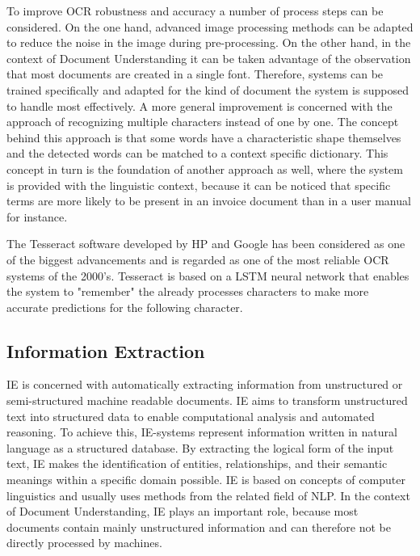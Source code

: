 To improve \ac{OCR} robustness and accuracy a number of process steps can be considered. On the one hand, advanced image processing methods can be adapted to reduce the noise in the image during pre-processing. On the other hand, in the context of Document Understanding it can be taken advantage of the observation that most documents are created in a single font. Therefore, systems can be trained specifically and adapted for the kind of document the system is supposed to handle most effectively.
A more general improvement is concerned with the approach of recognizing multiple characters instead of one by one. The concept behind this approach is that some words have a characteristic shape themselves and the detected words can be matched to a context specific dictionary. This concept in turn is the foundation of another approach as well, where the system is provided with the linguistic context, because it can be noticed that specific terms are more likely to be present in an invoice document than in a user manual for instance. \cite{nagy1999optical,baird2004robust}

The Tesseract software developed by HP and Google has been considered as one of the biggest advancements and is regarded as one of the most reliable \ac{OCR} systems of the 2000's. Tesseract is based on a \ac{LSTM} neural network that enables the system to "remember" the already processes characters to make more accurate predictions for the following character. \cite{Tesseract,hochreiter1997long}

\subsection{Information Extraction}
\ac{IE} is concerned with automatically extracting information from unstructured or semi-structured machine readable documents. \ac{IE} aims to transform unstructured text into structured data to enable computational analysis and automated reasoning. To achieve this, \ac{IE}-systems represent information written in natural language as a structured database. By extracting the logical form of the input text, \ac{IE} makes the identification of entities, relationships, and their semantic meanings within a specific domain possible. \ac{IE} is based on concepts of computer linguistics and usually uses methods from the related field of \acl{NLP}. In the context of Document Understanding, \ac{IE} plays an important role, because most documents contain mainly unstructured information and can therefore not be directly processed by machines. \cite{hobbs2010information,church1995commercial}

